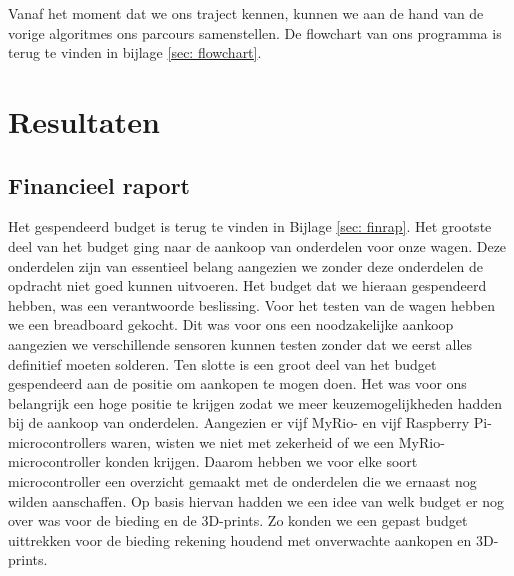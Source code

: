 \documentclass[a4paper,twoside,kulak]{kulakreport}
\begin{document}
	Vanaf het moment dat we ons traject kennen, kunnen we aan de hand van de vorige algoritmes ons parcours samenstellen. De flowchart van ons programma is terug te vinden in bijlage \ref{sec: flowchart}.
	


\section{Resultaten}
\subsection{Financieel raport}

Het gespendeerd budget is terug te vinden in Bijlage \ref{sec: finrap}.
Het grootste deel van het budget ging naar de aankoop van onderdelen voor onze wagen. Deze onderdelen zijn van essentieel belang aangezien we zonder deze onderdelen de opdracht niet goed kunnen uitvoeren. Het budget dat we hieraan gespendeerd hebben, was een verantwoorde beslissing. Voor het testen van de wagen hebben we een breadboard gekocht. Dit was voor ons een noodzakelijke aankoop aangezien we verschillende sensoren kunnen testen zonder dat we eerst alles definitief moeten solderen. 
Ten slotte is een groot deel van het budget gespendeerd aan de positie om aankopen te mogen doen. Het was voor ons belangrijk een hoge positie te krijgen zodat we meer keuzemogelijkheden hadden bij de aankoop van onderdelen. Aangezien er vijf MyRio- en vijf Raspberry Pi-microcontrollers waren, wisten we niet met zekerheid of we een MyRio-microcontroller konden krijgen. Daarom hebben we voor elke soort microcontroller een overzicht gemaakt met de onderdelen die we ernaast nog wilden aanschaffen. Op basis hiervan hadden we een idee van welk budget er nog over was voor de bieding en de 3D-prints. Zo konden we een gepast budget uittrekken voor de bieding rekening houdend met onverwachte aankopen en 3D-prints. 
\end{document}

